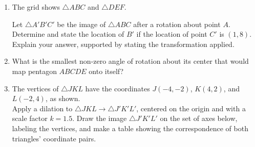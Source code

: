 \documentclass[12pt, twoside]{article}
\begin{document}
\begin{enumerate}
   \item The grid shows $\triangle ABC$ and $\triangle DEF$.
     \begin{center}
     \end{center}
     Let $\triangle A'B'C'$ be the image of $\triangle ABC$ after a rotation about point $A$. Determine and state the location of $B'$ if the location of point $C'$ is $(1,8)$. Explain your answer, supported by stating the transformation applied.

 \vspace{2cm}

   \item What is the smallest non-zero angle of rotation about its center that would map pentagon $ABCDE$ onto itself? \vspace{0.25cm}
   \begin{center}
     \end{center}



    \item The vertices of $\triangle JKL$ have the coordinates $J(-4,-2)$, $K(4,2)$, and $L(-2,4)$, as shown. \\[0.25cm]
    Apply a dilation to $\triangle JKL \rightarrow \triangle J'K'L'$, centered on the origin and with a scale factor $k=1.5$. Draw the image $\triangle J'K'L'$ on the set of axes below, labeling the vertices, and make a table showing the correspondence of both triangles' coordinate pairs.  \vspace{4cm}
    \begin{center}
\end{center}
\end{enumerate}
\end{document}
